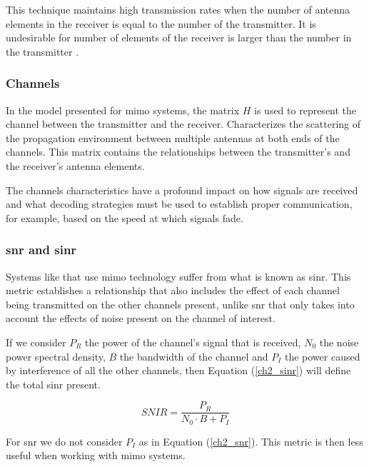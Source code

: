 \par This technique maintains high transmission rates when the number of antenna elements in the receiver is equal to the number of the transmitter. It is undesirable for number of elements of the receiver is larger than the number in the transmitter \cite{Bharati2020RealizationGains}.

\subsubsection{Channels}
\par In the model presented for \ac{mimo} systems, the matrix $H$ is used to represent the channel between the transmitter and the receiver. Characterizes the scattering of the propagation environment between multiple antennas at both ends of the channels. This matrix contains the relationships between the transmitter's and the receiver's antenna elements.

\par The channels characteristics have a profound impact on how signals are received and what decoding strategies must be used to establish proper communication, for example, based on the speed at which signals fade.

\subsubsection{\acl{snr} and \acl{sinr}}
\par Systems like that use \ac{mimo} technology suffer from what is known as \ac{sinr}. This metric establishes a relationship that also includes the effect of each channel being transmitted on the other channels present, unlike \ac{snr} that only takes into account the effects of noise present on the channel of interest.

\par If we consider $P_{R}$ the power of the channel's signal that is received, $N_{0}$ the noise power spectral 
density, $B$ the bandwidth of the channel and $P_{I}$ the power caused by interference of all the other channels, then Equation (\ref{ch2_sinr}) will define the total \ac{sinr} present.

\begin{equation}
    \label{ch2_sinr}
    SNIR = \frac{P_{R}}{N_{0}\cdot B + P_{I}}
\end{equation}

\par For \ac{snr} we do not consider $P_{I}$ as in Equation (\ref{ch2_snr}). This metric is then less useful when working with \ac{mimo} systems.

